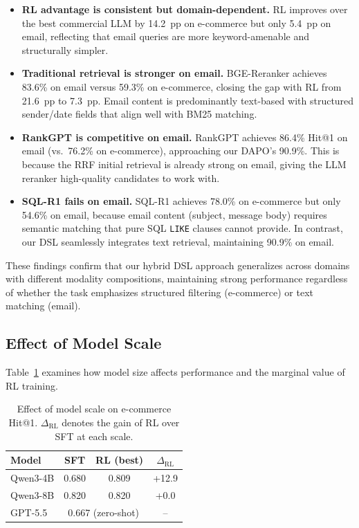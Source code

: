 \documentclass[11pt]{article}
\begin{document}
\begin{itemize}[leftmargin=*,nosep]
\item \textbf{RL advantage is consistent but domain-dependent.} RL improves over the best commercial LLM by 14.2~pp on e-commerce but only 5.4~pp on email, reflecting that email queries are more keyword-amenable and structurally simpler.

\item \textbf{Traditional retrieval is stronger on email.} BGE-Reranker achieves 83.6\% on email versus 59.3\% on e-commerce, closing the gap with RL from 21.6~pp to 7.3~pp. Email content is predominantly text-based with structured sender/date fields that align well with BM25 matching.

\item \textbf{RankGPT is competitive on email.} RankGPT achieves 86.4\% Hit@1 on email (vs.\ 76.2\% on e-commerce), approaching our DAPO's 90.9\%. This is because the RRF initial retrieval is already strong on email, giving the LLM reranker high-quality candidates to work with.

\item \textbf{SQL-R1 fails on email.} SQL-R1 achieves 78.0\% on e-commerce but only 54.6\% on email, because email content (subject, message body) requires semantic matching that pure SQL \texttt{LIKE} clauses cannot provide. In contrast, our DSL seamlessly integrates text retrieval, maintaining 90.9\% on email.
\end{itemize}

These findings confirm that our hybrid DSL approach generalizes across domains with different modality compositions, maintaining strong performance regardless of whether the task emphasizes structured filtering (e-commerce) or text matching (email).


\subsection{Effect of Model Scale}
\label{sec:scaling}

Table~\ref{tab:scaling} examines how model size affects performance and the marginal value of RL training.

\begin{table}[t]
\centering
\small
\caption{Effect of model scale on e-commerce Hit@1. $\Delta_\text{RL}$ denotes the gain of RL over SFT at each scale.}
\label{tab:scaling}
\begin{tabular}{lccc}
\toprule
\textbf{Model} & \textbf{SFT} & \textbf{RL (best)} & \textbf{$\Delta_\text{RL}$} \\
\midrule
Qwen3-4B & 0.680 & 0.809 & +12.9 \\
Qwen3-8B & 0.820 & 0.820 & +0.0 \\
\midrule
GPT-5.5 & \multicolumn{2}{c}{0.667 (zero-shot)} & -- \\
\bottomrule
\end{tabular}
\end{table}
\end{document}

